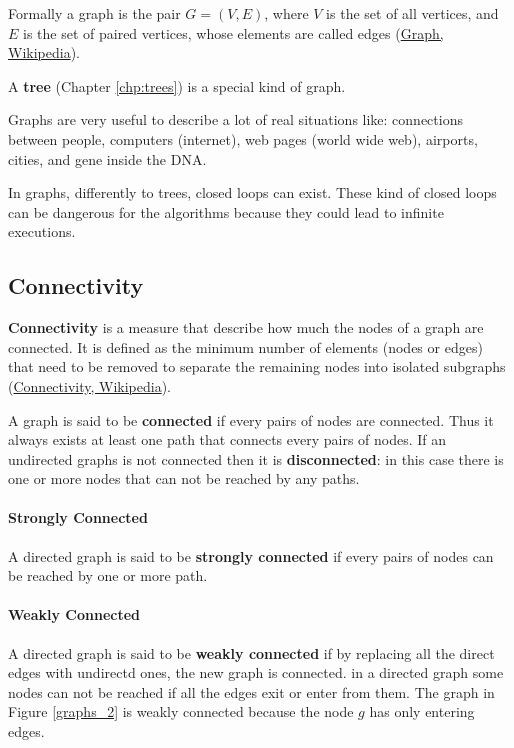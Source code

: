 Formally a graph is the pair \(G=(V, E)\), where \(V\) is the set of all vertices, and \(E\) is the set of paired vertices, whose elements are called edges \cite{wikigraphmath} (\href{https://en.wikipedia.org/wiki/Graph_(discrete_mathematics)}{Graph, Wikipedia}).

A \textbf{tree} (Chapter \ref{chp:trees}) is a special kind of graph.

Graphs are very useful to describe a lot of real situations like: connections between people, computers (internet), web pages (world wide web), airports, cities, and gene inside the DNA.

In graphs, differently to trees, closed loops can exist. These kind of closed loops can be dangerous for the algorithms because they could lead to infinite executions.

\subsection{Connectivity}
\textbf{Connectivity} is a measure that describe how much the nodes of a graph are connected. It is defined as the minimum number of elements (nodes or edges) that need to be removed to separate the remaining nodes into isolated subgraphs \cite{wikiconnectivity} (\href{https://en.wikipedia.org/wiki/Connectivity_(graph_theory)}{Connectivity, Wikipedia}).

A graph is said to be \textbf{connected} if every pairs of nodes are connected. Thus it always exists at least one path that connects every pairs of nodes. If an undirected graphs is not connected then it is \textbf{disconnected}: in this case there is one or more nodes that can not be reached by any paths.

\paragraph{Strongly Connected}
A directed graph is said to be \textbf{strongly connected} if every pairs of nodes can be reached by one or more path.

\paragraph{Weakly Connected}
A directed graph is said to be \textbf{weakly connected} if by replacing all the direct edges with undirectd ones, the new graph is connected. in a directed graph some nodes can not be reached if all the edges exit or enter from them. The graph in Figure \ref{graphs_2} is weakly connected because the node \(g\) has only entering edges.

